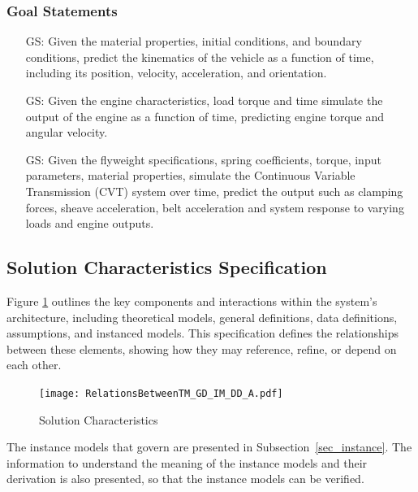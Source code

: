\documentclass[12pt]{article}
\newcounter{goalnum} %
\begin{document}
\subsubsection{Goal Statements}

\begin{itemize}

  \item[GS\refstepcounter{goalnum}\thegoalnum \label{GS1}:]  Given the material properties, initial conditions, and boundary conditions, predict the kinematics of the vehicle as a function of time, including its position, velocity, acceleration, and orientation.
  \item[GS\refstepcounter{goalnum}\thegoalnum \label{GS2}:]  Given the engine characteristics, load torque and time simulate the output of the engine as a function of time, predicting engine torque and angular velocity.
  \item[GS\refstepcounter{goalnum}\thegoalnum \label{GS3}:]  Given the flyweight specifications, spring coefficients, torque, input parameters, material properties, simulate the Continuous Variable Transmission (CVT) system over time, predict the output such as clamping forces, sheave acceleration, belt acceleration and system response to varying loads and engine outputs.

\end{itemize}

\subsection{Solution Characteristics Specification}

Figure \ref{Fig_SolutionCharacteristics} outlines the key components and interactions within the system's architecture, 
including theoretical models, general definitions, data definitions, assumptions, and instanced models.
This specification defines the relationships between these elements, showing how they may reference, refine, or depend on each other. 

\begin{figure}[H]
  \texttt{[image: RelationsBetweenTM\_GD\_IM\_DD\_A.pdf]}
  \caption{Solution Characteristics}
  \label{Fig_SolutionCharacteristics}
\end{figure}

The instance models that govern \progname{} are presented in
Subsection~\ref{sec_instance}.  The information to understand the meaning of the
instance models and their derivation is also presented, so that the instance
models can be verified.
\end{document}
